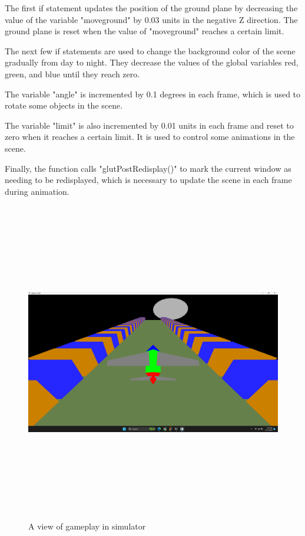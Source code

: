 \documentclass[12pt,a4]{article}
\begin{document}
{The first if statement updates the position of the ground plane by decreasing the value of the variable "moveground" by 0.03 units in the negative Z direction. The ground plane is reset when the value of "moveground" reaches a certain limit.

The next few if statements are used to change the background color of the scene gradually from day to night. They decrease the values of the global variables red, green, and blue until they reach zero.

The variable "angle" is incremented by 0.1 degrees in each frame, which is used to rotate some objects in the scene.

The variable "limit" is also incremented by 0.01 units in each frame and reset to zero when it reaches a certain limit. It is used to control some animations in the scene.

Finally, the function calls "glutPostRedisplay()" to mark the current window as needing to be redisplayed, which is necessary to update the scene in each frame during animation.\\

\begin{figure}[h]
    \centering
    \includegraphics[width=\textwidth, height =14cm]{Screenshot (44).png}
    \caption{A view of gameplay in simulator}
\end{figure}
}
\end{document}
